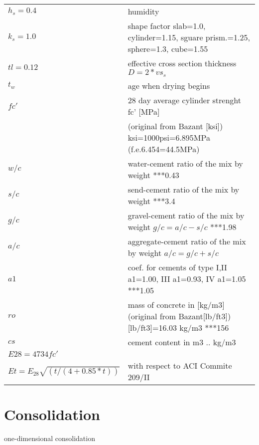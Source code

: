 \begin{center}
\begin{tabular}{|l|l}
\hline
$h_s = 0.4$ & humidity
\\  
$k_s = 1.0$ & shape factor \index{shape factor}  slab=1.0, cylinder=1.15, sguare prism.=1.25, sphere=1.3, cube=1.55
\\
$tl = 0.12$ & effective cross section thickness       $D=2*vs_s$
%
%
\\
$t_w$ & age when drying begins
\\
$fc'$ & 28 day average cylinder strenght \index{average cylinder strenght} fc' [MPa]
\\
 & (original from Bazant [ksi]) ksi=1000psi=6.895MPa (f.e.6.454=44.5MPa)
\\
$w/c$ & water-cement ratio \index{water-cement ratio}\index{ratio!water-cement} of the mix by weight   ***0.43
\\
$s/c$ & send-cement ratio \index{send-cement ratio}\index{ratio!send-cement} of the mix by weight    ***3.4
\\
$g/c$ & gravel-cement ratio \index{gravel-cement ratio}\index{ratio!gravel-cement} of the mix by weight $g/c=a/c-s/c$     ***1.98
\\
$a/c$ & aggregate-cement ratio \index{aggregate-cement ratio}\index{ratio!aggregate-cement} of the mix by weight $a/c=g/c+s/c$
\\
$a1$ & coef. for cements of type I,II a1=1.00, III a1=0.93, IV a1=1.05   ***1.05
\\
$ro$ & mass of concrete in [kg/m3]   (original from Bazant[lb/ft3]) [lb/ft3]=16.03 kg/m3 ***156
\\
$cs$ & cement content in m3  .. kg/m3
\\
$E28=4734 fc'$ &
\\
$Et=E_{28} \sqrt{(t/(4+0.85*t))}$ & with respect to ACI Commite 209/II
\\ \hline
\end{tabular}
\end{center}

\section{Consolidation}
one-dimensional consolidation

